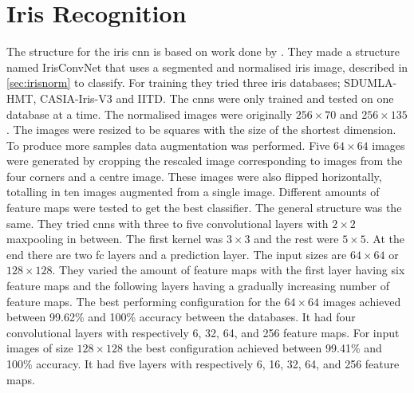 
\section{Iris Recognition}
\label{sec:cnn_iris_rec}
The structure for the iris \gls{cnn} is based on work done by \cite{Al-Waisy2017}. They made a structure named IrisConvNet that uses a segmented and normalised iris image, described in \autoref{sec:irisnorm} to classify. For training they tried three iris databases; SDUMLA-HMT, CASIA-Iris-V3 and IITD. The \gls{cnn}s were only trained and tested on one database at a time.  The normalised images were originally $256\times70$ and $256\times135$. The images were resized to be squares with the size of the shortest dimension. To produce more samples data augmentation was performed. Five $64\times64$ images were generated by cropping the rescaled image corresponding to images from the four corners and a centre image. These images were also flipped horizontally, totalling in ten images augmented from a single image. Different amounts of feature maps were tested to get the best classifier. The general structure was the same. They tried \gls{cnn}s with three to five convolutional layers with $2\times2$ maxpooling in between. The first kernel was $3\times3$ and the rest were $5\times5$. At the end there are two \gls{fc} layers and a prediction layer. The input sizes are $64\times64$ or $128\times128$. They varied the amount of feature maps with the first layer having six feature maps and the following layers having a gradually increasing number of feature maps. The best performing configuration for the $64\times64$ images achieved between 99.62\% and 100\% accuracy between the databases. It had four convolutional layers with respectively 6, 32, 64, and 256 feature maps. For input images of size $128\times128$ the best configuration achieved between 99.41\% and 100\% accuracy. It had five layers with respectively 6, 16, 32, 64, and 256 feature maps.

